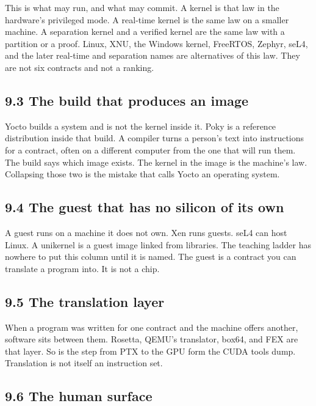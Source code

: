 \documentclass[10pt,letterpaper]{article}
\begin{document}
This is what may run, and what may commit. A kernel is that law in the
hardware's privileged mode. A real-time kernel is the same law on a
smaller machine. A separation kernel and a verified kernel are the same
law with a partition or a proof. Linux, XNU, the Windows kernel,
FreeRTOS, Zephyr, seL4, and the later real-time and separation names are
alternatives of this law. They are not six contracts and not a ranking.

\subsection{9.3 The build that produces an
image}\label{the-build-that-produces-an-image}

Yocto builds a system and is not the kernel inside it. Poky is a
reference distribution inside that build. A compiler turns a person's
text into instructions for a contract, often on a different computer
from the one that will run them. The build says which image exists. The
kernel in the image is the machine's law. Collapsing those two is the
mistake that calls Yocto an operating system.

\subsection{9.4 The guest that has no silicon of its
own}\label{the-guest-that-has-no-silicon-of-its-own}

A guest runs on a machine it does not own. Xen runs guests. seL4 can
host Linux. A unikernel is a guest image linked from libraries. The
teaching ladder has nowhere to put this column until it is named. The
guest is a contract you can translate a program into. It is not a chip.

\subsection{9.5 The translation layer}\label{the-translation-layer}

When a program was written for one contract and the machine offers
another, software sits between them. Rosetta, QEMU's translator, box64,
and FEX are that layer. So is the step from PTX to the GPU form the CUDA
tools dump. Translation is not itself an instruction set.

\subsection{9.6 The human surface}\label{the-human-surface}
\end{document}
